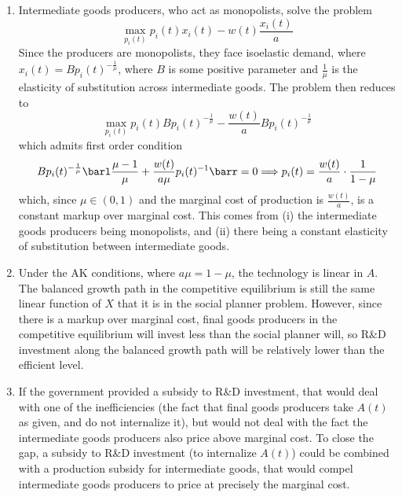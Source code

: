 \documentclass[10pt]{article}
\begin{document}
\begin{enumerate}
	\item Intermediate goods producers, who act as monopolists, solve the problem \[\max_{p_i(t)} p_i(t)x_i(t) - w(t) \frac{x_i(t)}{a}\]Since the producers are monopolists, they face isoelastic demand, where $x_i(t) = Bp_i(t)^{-\frac{1}{\mu}}$, where $B$ is some positive parameter and $\frac{1}{\mu}$ is the elasticity of substitution across intermediate goods. The problem then reduces to\[\max_{p_i(t)} p_i(t) Bp_i(t)^{-\frac{1}{\mu}} - \frac{w(t)}{a} Bp_i(t)^{-\frac{1}{\mu}}\]which admits first order condition\[Bp_i(t)^{-\frac{1}{\mu}}\barl \frac{\mu-1}{\mu} + \frac{w(t)}{a\mu} p_i(t)^{-1}\barr = 0 \Longrightarrow p_i(t) = \frac{w(t)}{a} \cdot \frac{1}{1-\mu}\]which, since $\mu \in (0,1)$ and the marginal cost of production is $\frac{w(t)}{a}$, is a constant markup over marginal cost. This comes from (i) the intermediate goods producers being monopolists, and (ii) there being a constant elasticity of substitution between intermediate goods.
	\item Under the AK conditions, where $a\mu = 1-\mu$, the technology is linear in $A$. The balanced growth path in the competitive equilibrium is still the same linear function of $X$ that it is in the social planner problem. However, since there is a markup over marginal cost, final goods producers in the competitive equilibrium will invest less than the social planner will, so R\&D investment along the balanced growth path will be relatively lower than the efficient level.
	\item If the government provided a subsidy to R\&D investment, that would deal with one of the inefficiencies (the fact that final goods producers take $A(t)$ as given, and do not internalize it), but would not deal with the fact the intermediate goods producers also price above marginal cost. To close the gap, a subsidy to R\&D investment (to internalize $A(t)$) could be combined with a production subsidy for intermediate goods, that would compel intermediate goods producers to price at precisely the marginal cost.
\end{enumerate}
\end{document}
